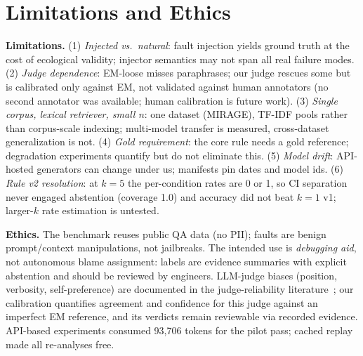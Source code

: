 \documentclass[conference]{IEEEtran}
\begin{document}
\section{Limitations and Ethics}
\textbf{Limitations.} (1) \emph{Injected vs.\ natural}: fault injection
yields ground truth at the cost of ecological validity; injector semantics
may not span all real failure modes. (2) \emph{Judge dependence}: EM-loose
misses paraphrases; our judge rescues some but is calibrated only against
EM, not validated against human annotators (no second annotator was
available; human calibration is future work). (3) \emph{Single corpus, lexical
retriever, small $n$}: one dataset (MIRAGE), TF-IDF pools rather than
corpus-scale indexing; multi-model transfer is measured, cross-dataset
generalization is not. (4) \emph{Gold requirement}: the core rule needs a
gold reference; degradation experiments quantify but do not eliminate this.
(5) \emph{Model drift}: API-hosted generators can change under us; manifests
pin dates and model ids. (6) \emph{Rule v2 resolution}: at $k{=}5$ the
per-condition rates are 0 or 1, so CI separation never engaged abstention
(coverage 1.0) and accuracy did not beat $k{=}1$ v1; larger-$k$ rate
estimation is untested.

\textbf{Ethics.} The benchmark reuses public QA data (no PII); faults are
benign prompt/context manipulations, not jailbreaks. The intended use is
\emph{debugging aid}, not autonomous blame assignment: labels are evidence
summaries with explicit abstention and should be reviewed by engineers.
LLM-judge biases (position, verbosity, self-preference) are documented in
the judge-reliability literature~\cite{zheng2023mtbench}; our calibration
quantifies agreement and confidence for this judge against an imperfect EM
reference, and its verdicts remain reviewable via recorded evidence.
API-based experiments consumed 93,706 tokens for the pilot pass; cached
replay made all re-analyses free.
\end{document}
